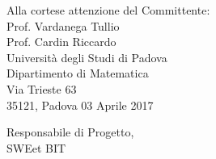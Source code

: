 \begin{minipage}{0.7\textwidth}
	\begin{flushright}
		Alla cortese attenzione del Committente: \\
		Prof. Vardanega Tullio \\
		Prof. Cardin Riccardo \\
		Università degli Studi di Padova \\
		Dipartimento di Matematica \\
		Via Trieste 63\\
		35121, Padova
		\vspace{5mm} 03 Aprile 2017
	\end{flushright}
\end{minipage}

\begin{minipage}{\textwidth}
	\begin{flushleft}
		Responsabile di Progetto,\\
		SWEet BIT\\
	\end{flushleft}
\end{minipage}

